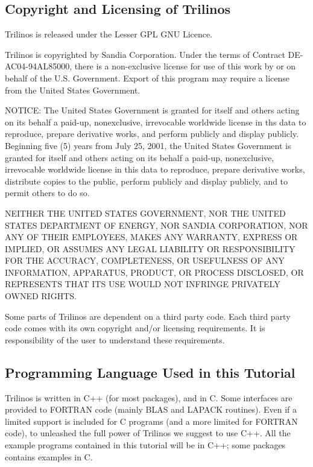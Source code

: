 
\subsection{Copyright and Licensing of Trilinos}
\label{sec:copyright}

Trilinos is released under the Lesser GPL GNU Licence.

Trilinos is copyrighted by Sandia Corporation. Under the terms of
Contract DE-AC04-94AL85000, there is a non-exclusive license for use of
this work by or on behalf of the U.S. Government.  Export of this
program may require a license from the United States Government.

NOTICE: The United States Government is granted for itself and others
acting on its behalf a paid-up, nonexclusive, irrevocable worldwide
license in ths data to reproduce, prepare derivative works, and perform
publicly and display publicly.  Beginning five (5) years from July 25,
2001, the United States Government is granted for itself and others
acting on its behalf a paid-up, nonexclusive, irrevocable worldwide
license in this data to reproduce, prepare derivative works, distribute
copies to the public, perform publicly and display publicly, and to
permit others to do so.

NEITHER THE UNITED STATES GOVERNMENT, NOR THE UNITED STATES DEPARTMENT
OF ENERGY, NOR SANDIA CORPORATION, NOR ANY OF THEIR EMPLOYEES, MAKES ANY
WARRANTY, EXPRESS OR IMPLIED, OR ASSUMES ANY LEGAL LIABILITY OR
RESPONSIBILITY FOR THE ACCURACY, COMPLETENESS, OR USEFULNESS OF ANY
INFORMATION, APPARATUS, PRODUCT, OR PROCESS DISCLOSED, OR REPRESENTS
THAT ITS USE WOULD NOT INFRINGE PRIVATELY OWNED RIGHTS.

\medskip

Some parts of Trilinos are dependent on a third party code. Each third
party code comes with its own copyright and/or licensing requirements.
It is responsibility of the user to understand these requirements.


\subsection{Programming Language Used in this Tutorial}
\label{sec:language}

Trilinos is written in C++ (for most packages), and in C. Some
interfaces are provided to FORTRAN code (mainly BLAS and LAPACK
routines). Even if a limited support is included for C programs (and a
more limited for FORTRAN code), to unleashed the full power of Trilinos
we suggest to use C++. All the example programs contained in this
tutorial will be in C++; some packages contains examples in C.

